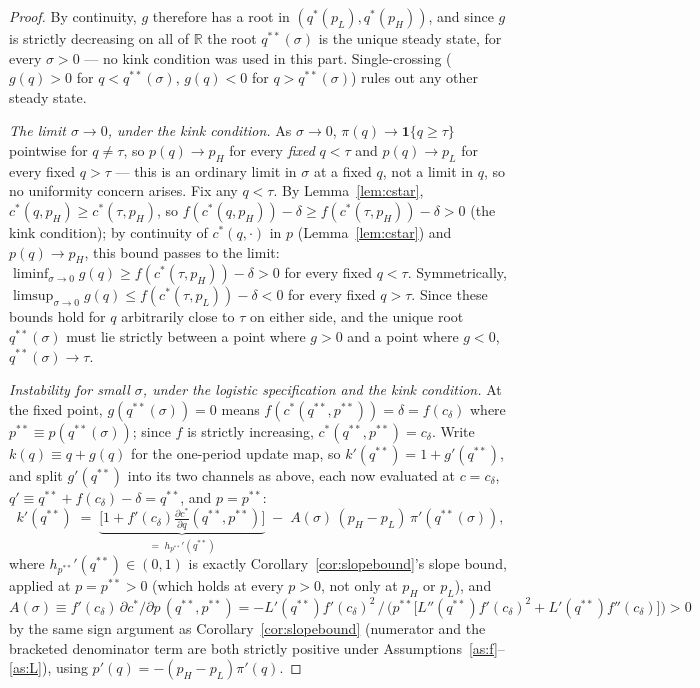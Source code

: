 \begin{proof}
By continuity, $g$ therefore has a root in $(q^*(p_L), q^*(p_H))$, and since $g$ is strictly decreasing on all of $\mathbb{R}$ the root $q^{**}(\sigma)$ is the unique steady state, for every $\sigma>0$ — no kink condition was used in this part. Single-crossing ($g(q) > 0$ for $q < q^{**}(\sigma)$, $g(q) < 0$ for $q > q^{**}(\sigma)$) rules out any other steady state.

\emph{The limit $\sigma \to 0$, under the kink condition.} As $\sigma \to 0$, $\pi(q) \to \mathbf{1}\{q \geq \tau\}$ pointwise for $q \neq \tau$, so $p(q) \to p_H$ for every \emph{fixed} $q < \tau$ and $p(q) \to p_L$ for every fixed $q > \tau$ — this is an ordinary limit in $\sigma$ at a fixed $q$, not a limit in $q$, so no uniformity concern arises. Fix any $q < \tau$. By Lemma~\ref{lem:cstar}, $c^*(q,p_H) \geq c^*(\tau,p_H)$, so $f(c^*(q,p_H)) - \delta \geq f(c^*(\tau,p_H)) - \delta > 0$ (the kink condition); by continuity of $c^*(q,\cdot)$ in $p$ (Lemma~\ref{lem:cstar}) and $p(q)\to p_H$, this bound passes to the limit: $\liminf_{\sigma\to0} g(q) \geq f(c^*(\tau,p_H)) - \delta > 0$ for every fixed $q<\tau$. Symmetrically, $\limsup_{\sigma\to0} g(q) \leq f(c^*(\tau,p_L)) - \delta < 0$ for every fixed $q>\tau$. Since these bounds hold for $q$ arbitrarily close to $\tau$ on either side, and the unique root $q^{**}(\sigma)$ must lie strictly between a point where $g>0$ and a point where $g<0$, $q^{**}(\sigma) \to \tau$.

\emph{Instability for small $\sigma$, under the logistic specification and the kink condition.} At the fixed point, $g(q^{**}(\sigma))=0$ means $f(c^*(q^{**},p^{**}))=\delta=f(c_\delta)$ where $p^{**}\equiv p(q^{**}(\sigma))$; since $f$ is strictly increasing, $c^*(q^{**},p^{**})=c_\delta$. Write $k(q) \equiv q + g(q)$ for the one-period update map, so $k'(q^{**}) = 1 + g'(q^{**})$, and split $g'(q^{**})$ into its two channels as above, each now evaluated at $c=c_\delta$, $q'\equiv q^{**}+f(c_\delta)-\delta=q^{**}$, and $p=p^{**}$:
\[
k'(q^{**}) \;=\; \underbrace{\Big[1+f'(c_\delta)\tfrac{\partial c^*}{\partial q}(q^{**},p^{**})\Big]}_{=\; h_{p^{**}}'(q^{**})} \;-\; A(\sigma)\,(p_H-p_L)\,\pi'(q^{**}(\sigma)),
\]
where $h_{p^{**}}'(q^{**}) \in (0,1)$ is exactly Corollary~\ref{cor:slopebound}'s slope bound, applied at $p=p^{**}>0$ (which holds at every $p>0$, not only at $p_H$ or $p_L$), and $A(\sigma) \equiv f'(c_\delta)\,\partial c^*/\partial p\,(q^{**},p^{**}) = -L'(q^{**})f'(c_\delta)^2 \,/\,\big(p^{**}\big[L''(q^{**})f'(c_\delta)^2 + L'(q^{**})f''(c_\delta)\big]\big) > 0$ by the same sign argument as Corollary~\ref{cor:slopebound} (numerator and the bracketed denominator term are both strictly positive under Assumptions~\ref{as:f}--\ref{as:L}), using $p'(q) = -(p_H-p_L)\pi'(q)$.


\end{proof}
